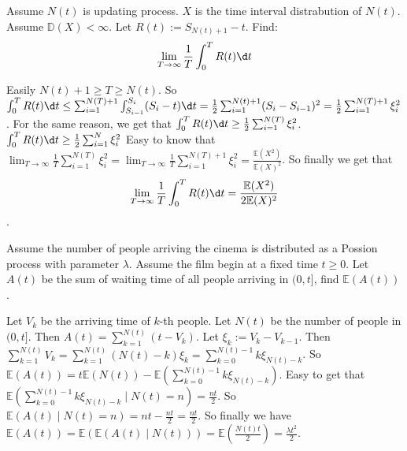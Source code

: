 \documentclass{ctexart}
\newif\ifpreface
\begin{document}
\large
\iffalse
  \setlength{\baselineskip}{1.2em}
  \ifpreface
    
  \else
    \maketitle
  \fi
\fi
{}
\begin{problem}\label{pro:1}
  Assume \(N(t)\) is updating process. \(X\) is the time interval distrabution of \(N(t)\).
  Assume \(\mathbb{D}(X)<\infty\).
  Let \(R(t):=S_{N(t)+1}-t\). Find:
  \[
    \lim_{T \to \infty} \frac{1}{T}\int_{0}^{T}R(t) \d t
  \]
\end{problem}
\begin{solution}
  Easily \(N(t)+1 \geq T \geq N(t)\).
  So \(\int_{0}^{T}R(t) \d t \leq \sum_{i=1}^{N(T)+1} \int_{S_{i-1}}^{S_i}(S_i-t) \d t=\frac{1}{2}\sum_{i=1}^{N(t)+1} (S_i-S_{i-1})^2=\frac{1}{2} \sum_{i=1}^{N(T)+1} \xi_i^2\).
  For the same reason, we get that \(\int_{0}^{T}R(t) \d t \geq \frac{1}{2} \sum_{i=1}^{N(T)} \xi_i^2\).
  \(\int_{0}^T R(t)\d t \geq \frac{1}{2}\sum_{i=1}^{N} \xi_i^2\)
  Easy to know that \(\lim_{T \to \infty} \frac{1}{T} \sum_{i=1}^{N(T)} \xi_i^2=\lim_{T \to \infty} \frac{1}{T} \sum_{i=1}^{N(T)+1} \xi_i^2=\frac{\mathbb{E}(X^2)}{\mathbb{E}(X)^2}\).
  So finally we get that
  \[
    \lim_{T \to \infty} \frac{1}{T}\int_{0}^{T}R(t) \d t=\frac{\mathbb{E}(X^2)}{2\mathbb{E}(X)^2}
  \]
  .
\end{solution}
\begin{problem}\label{pro:2}
  Assume the number of people arriving the cinema is distributed as a Possion process with parameter \(\lambda\).
  Assume the film begin at a fixed time \(t \geq 0\).
  Let \(A(t)\) be the sum of waiting time of all people arriving in \((0,t]\), find \(\mathbb{E}(A(t))\).
\end{problem}
\begin{solution}
  Let \(V_k\) be the arriving time of \(k\)-th people. Let \(N(t)\) be the number of people in \((0,t]\).
  Then \(A(t)=\sum_{k=1}^{N(t)} (t-V_k)\). Let \(\xi_k:=V_k-V_{k-1}\).
  Then \(\sum_{k=1}^{N(t)} V_k=\sum_{k=1}^{N(t)} (N(t)-k)\xi_k=\sum_{k=0}^{N(t)-1} k \xi_{N(t)-k}\).
  So \(\mathbb{E}(A(t))=t \mathbb{E}(N(t))-\mathbb{E}(\sum_{k=0}^{N(t)-1} k\xi_{N(t)-k})\).
  Easy to get that \(\mathbb{E}(\sum_{k=0}^{N(t)-1} k\xi_{N(t)-k} \mid N(t)=n)=\frac{nt}{2}\).
  So \(\mathbb{E}(A(t) \mid N(t)=n)=nt-\frac{nt}{2}=\frac{nt}{2}\).
  So finally we have \(\mathbb{E}(A(t))=\mathbb{E}(\mathbb{E}(A(t) \mid N(t)))=\mathbb{E}(\frac{N(t)t}{2})=\frac{\lambda t^2}{2}\).
\end{solution}
\end{document}
